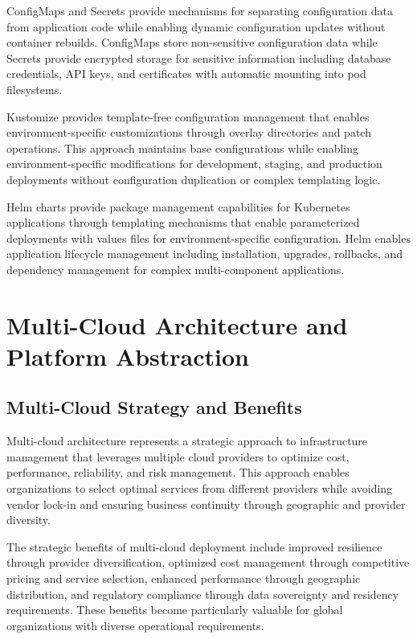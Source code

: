 ConfigMaps and Secrets provide mechanisms for separating configuration data from application code while enabling dynamic configuration updates without container rebuilds. ConfigMaps store non-sensitive configuration data while Secrets provide encrypted storage for sensitive information including database credentials, API keys, and certificates with automatic mounting into pod filesystems.

Kustomize provides template-free configuration management that enables environment-specific customizations through overlay directories and patch operations. This approach maintains base configurations while enabling environment-specific modifications for development, staging, and production deployments without configuration duplication or complex templating logic.

Helm charts provide package management capabilities for Kubernetes applications through templating mechanisms that enable parameterized deployments with values files for environment-specific configuration. Helm enables application lifecycle management including installation, upgrades, rollbacks, and dependency management for complex multi-component applications.

\section{Multi-Cloud Architecture and Platform Abstraction}

\subsection{Multi-Cloud Strategy and Benefits}

Multi-cloud architecture represents a strategic approach to infrastructure management that leverages multiple cloud providers to optimize cost, performance, reliability, and risk management. This approach enables organizations to select optimal services from different providers while avoiding vendor lock-in and ensuring business continuity through geographic and provider diversity.

The strategic benefits of multi-cloud deployment include improved resilience through provider diversification, optimized cost management through competitive pricing and service selection, enhanced performance through geographic distribution, and regulatory compliance through data sovereignty and residency requirements. These benefits become particularly valuable for global organizations with diverse operational requirements.

